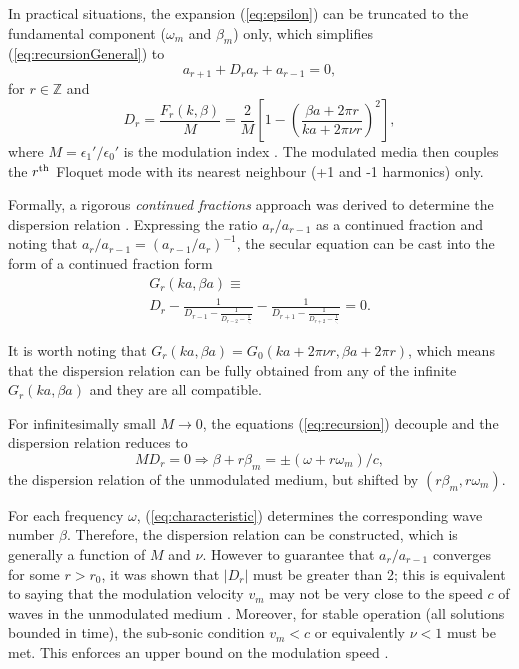 \documentclass[journal]{IEEEtran}
\begin{document}
In practical situations, the expansion (\ref{eq:epsilon}) can be truncated to the fundamental component ($\omega_m$ and $\beta_m$) only, which simplifies (\ref{eq:recursionGeneral}) to
\begin{equation}
\label{eq:recursion}
a_{r+1}+D_ra_r+a_{r-1}=0,
\end{equation}
for $r \in \mathbb{Z}$ and
\begin{equation}
\label{eq:Dn}
D_r=\frac{F_r(k,\beta)}{M}=\frac{2}{M}\left[1-\left(\frac{\beta a+2\pi r}{ka+2\pi\nu r}\right)^2\right],
\end{equation}
where  $M=\epsilon_1'/\epsilon_0'$ is the modulation index \cite{Oliner1961}. The modulated media then couples the $r^\textnormal{th}$ Floquet mode with its nearest neighbour (+1 and -1 harmonics) only.

Formally, a rigorous \emph{continued fractions} approach was derived to determine the dispersion relation \cite{Oliner1961, Cassedy1963}. Expressing the ratio $a_r/a_{r-1}$ as a continued fraction and noting that $a_r/a_{r-1}=(a_{r-1}/a_r)^{-1}$, the secular equation can be cast into the form of a continued fraction form \cite{Oliner1961, Cassedy1963}
\begin{multline}
\label{eq:characteristic}
G_r(ka,\beta a)\equiv
\\ D_r-\frac{1}{D_{r-1}-\frac{1}{D_{r-2}-\frac{1}{\ddots}}}-\frac{1}{D_{r+1}-\frac{1}{D_{r+2}-\frac{1}{\ddots}}}=0.
\end{multline}

It is worth noting that $G_r(ka,\beta a)=G_0(ka+2\pi\nu r, \beta a+2\pi r)$, which means that the dispersion relation can be fully obtained from any of the infinite $G_r(ka,\beta a)$ and they are all compatible.

For infinitesimally small $M\rightarrow 0$, the equations  (\ref{eq:recursion}) decouple and the dispersion relation reduces to
\begin{equation}
\label{eq:MsmallDispersion}
MD_r=0\Rightarrow \beta+r\beta_m=\pm\left(\omega+r\omega_m\right)/c,
\end{equation}
the dispersion relation of the unmodulated medium, but shifted by $(r\beta_m, r\omega_m)$.

For each frequency $\omega$, (\ref{eq:characteristic}) determines the corresponding wave number $\beta$. Therefore, the dispersion relation can be constructed, which is generally a function of $M$ and $\nu$. However to guarantee that $a_r/a_{r-1}$ converges for some $r>r_0$, it was shown that $|D_r|$ must be greater than 2; this is equivalent to saying that the modulation velocity $v_m$ may not be very close to the speed  $c$ of waves in the unmodulated medium \cite{Oliner1961, Cassedy1963}. Moreover, for stable operation (all solutions bounded in time), the sub-sonic condition $v_m<c$ or equivalently $\nu<1$ must be met. This enforces an upper bound on the modulation speed \cite{Cassedy1967}.
\end{document}
